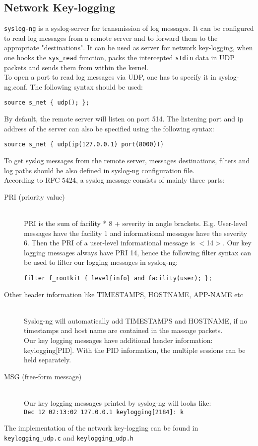 \subsection{Network Key-logging}
\texttt{syslog-ng} is a syslog-server for transmission of log messages. It can be configured to read log messages from a remote server and to forward them to the appropriate "destinations". It can be used as server for network key-logging, when one hooks the \texttt{sys\_read} function, packs the intercepted \texttt{stdin} data in UDP packets and sends them from within the kernel.\\ 
To open a port to read log messages via UDP, one has to specify it in syslog-ng.conf. The following syntax should be used:
\lstset{escapechar=,style=customc}
\begin{lstlisting}
source s_net { udp(); };
\end{lstlisting}
By default, the remote server will listen on port 514. The listening port and ip address of the server can also be specified using the following syntax:
\lstset{escapechar=,style=customc}
\begin{lstlisting}
source s_net { udp(ip(127.0.0.1) port(8000))}
\end{lstlisting}
To get syslog messages from the remote server, messages destinations, filters and log paths should be also defined in syslog-ng configuration file.\\
According to RFC 5424, a syslog message consists of mainly three parts:
\begin{description}
\item[PRI (priority value)] \hfill \\
PRI is the sum of facility * 8 + severity in angle brackets. E.g. User-level
messages have the facility 1 and informational messages have the severity 6.
Then the PRI of a user-level informational message is $<$14$>$. 
Our key logging messages  always have PRI 14, hence the following filter 
syntax can be used to filter our logging messages in syslog-ng:
\lstset{escapechar=,style=customc}
\begin{lstlisting}
filter f_rootkit { level{info} and facility(user); };
\end{lstlisting}
\item[Other header information like TIMESTAMPS, HOSTNAME, APP-NAME etc] \hfill \\
Syslog-ng will automatically add TIMESTAMPS and HOSTNAME, if no timestamps 
and host name are contained in the massage packets.\\ 
Our key logging messages have additional header information: keylogging[PID]. 
With the PID information, the multiple sessions can be held separately.
\item[MSG (free-form message)]\hfill\\
Our key logging messages printed by syslog-ng will looks like:
\\
\verb+Dec 12 02:13:02 127.0.0.1 keylogging[2184]: k+
\end{description}
The implementation of the network key-logging can be found in 
\verb+keylogging_udp.c+ and \verb+keylogging_udp.h+\\
